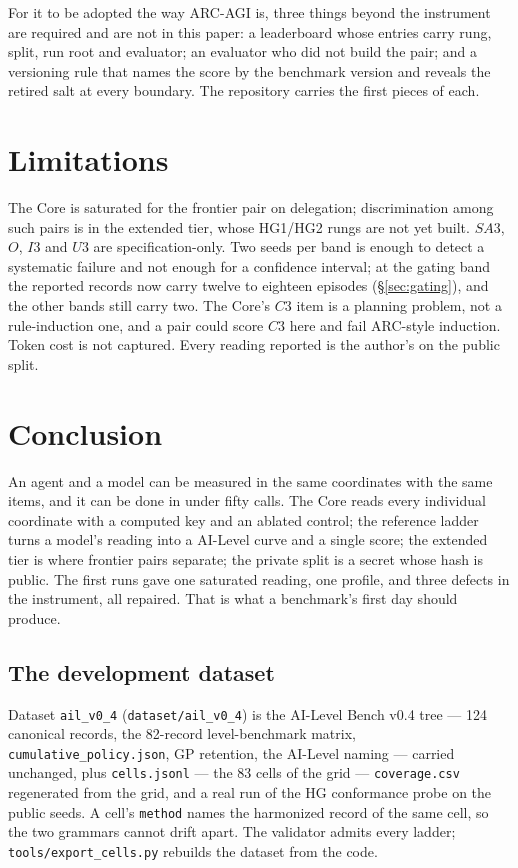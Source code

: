 \documentclass[11pt]{article}
\theoremstyle{definition}
\begin{document}
For it to be adopted the way ARC-AGI is, three things beyond the instrument are required and are not in this paper: a leaderboard whose entries carry rung, split, run root and evaluator; an evaluator who did not build the pair; and a versioning rule that names the score by the benchmark version and reveals the retired salt at every boundary. The repository carries the first pieces of each.

\section{Limitations}\label{sec:limits}

The Core is saturated for the frontier pair on delegation; discrimination among such pairs is in the extended tier, whose HG1/HG2 rungs are not yet built. $SA3$, $O$, $I3$ and $U3$ are specification-only. Two seeds per band is enough to detect a systematic failure and not enough for a confidence interval; at the gating band the reported records now carry twelve to eighteen episodes (\S\ref{sec:gating}), and the other bands still carry two. The Core's $C3$ item is a planning problem, not a rule-induction one, and a pair could score $C3$ here and fail ARC-style induction. Token cost is not captured. Every reading reported is the author's on the public split.

\section{Conclusion}

An agent and a model can be measured in the same coordinates with the same items, and it can be done in under fifty calls. The Core reads every individual coordinate with a computed key and an ablated control; the reference ladder turns a model's reading into a AI-Level curve and a single score; the extended tier is where frontier pairs separate; the private split is a secret whose hash is public. The first runs gave one saturated reading, one profile, and three defects in the instrument, all repaired. That is what a benchmark's first day should produce.

\subsection{The development dataset}\label{sec:devdataset}
Dataset \texttt{ail\_v0\_4} (\texttt{dataset/ail\_v0\_4}) is the AI-Level Bench v0.4 tree --- 124 canonical records, the 82-record level-benchmark matrix, \texttt{cumulative\_policy.json}, GP retention, the AI-Level naming --- carried unchanged, plus \texttt{cells.jsonl} --- the 83 cells of the grid --- \texttt{coverage.csv} regenerated from the grid, and a real run of the HG conformance probe on the public seeds. A cell's \texttt{method} names the harmonized record of the same cell, so the two grammars cannot drift apart. The validator admits every ladder; \texttt{tools/export\_cells.py} rebuilds the dataset from the code.
\end{document}
